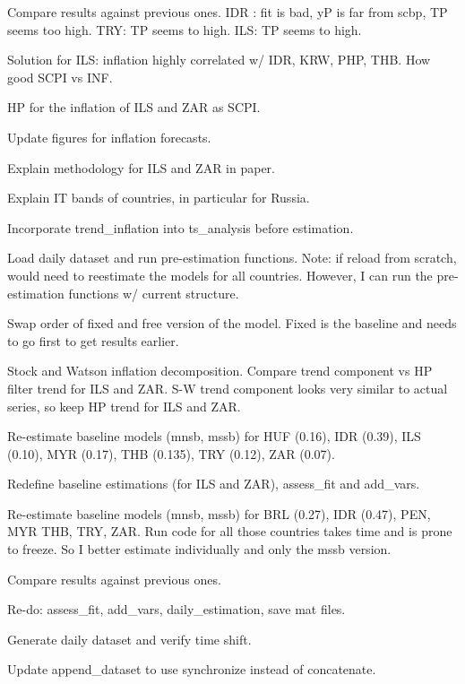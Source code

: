 \documentclass[12pt]{article}
\newcommand{\cmark}{\ding{51}}
\newcommand{\xmark}{\ding{55}}
\newcommand{\done}{\rlap{$\square$}{\raisebox{2pt}{\large\hspace{1pt}\cmark}}%
	\hspace{-2.5pt}}
\newcommand{\wontdo}{\rlap{$\square$}{\large\hspace{1pt}\xmark}}
\begin{document}
\begin{todolist}
\begin{todolist}
		\item[\done] Compare results against previous ones. IDR : fit is bad, yP is far from scbp, TP seems too high. TRY: TP seems to high. ILS: TP seems to high.
		\item[\done] Solution for ILS: inflation highly correlated w/ IDR, KRW, PHP, THB. How good SCPI vs INF.
		\item[\done] HP for the inflation of ILS and ZAR as SCPI.
		\item[\done] Update figures for inflation forecasts.
		\item[\done] Explain methodology for ILS and ZAR in paper.
		\item[\done] Explain IT bands of countries, in particular for Russia.
		\item[\done] Incorporate trend_inflation into ts_analysis before estimation.
		\item[\wontdo] Load daily dataset and run pre-estimation functions. Note: if reload from scratch, would need to reestimate the models for all countries. However, I can run the pre-estimation functions w/ current structure.
		\item[\done] Swap order of fixed and free version of the model. Fixed is the baseline and needs to go first to get results earlier.
		\item[\done] Stock and Watson inflation decomposition. Compare trend component vs HP filter trend for ILS and ZAR.  S-W trend component looks very similar to actual series, so keep HP trend for ILS and ZAR.
		\item[\done] Re-estimate baseline models (mnsb, mssb) for HUF (0.16), IDR (0.39), ILS (0.10), MYR (0.17), THB (0.135), TRY (0.12), ZAR (0.07). 
		\item[\done] Redefine baseline estimations (for ILS and ZAR), assess_fit and add_vars.
		\item[\wontdo] Re-estimate baseline models (mnsb, mssb) for BRL (0.27), IDR (0.47), PEN, MYR THB, TRY, ZAR. Run code for all those countries takes time and is prone to freeze. So I better estimate individually and only the mssb version.
		\item[\done] Compare results against previous ones.
		\item[\done] Re-do: assess_fit, add_vars, daily_estimation, save mat files.
	\end{todolist}
	\item[\done] Generate daily dataset and verify time shift.
	\begin{todolist}
		\item[\done] Update append_dataset to use synchronize instead of concatenate.

\end{todolist}
\end{todolist}
\end{document}
